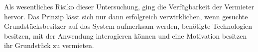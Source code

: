Als wesentliches Risiko dieser Untersuchung, ging die Verfügbarkeit der Vermieter hervor. Das Prinzip lässt sich nur dann erfolgreich verwirklichen, wenn gesuchte Grundstücksbesitzer auf das System aufmerksam werden, benötigte Technologien besitzen, mit der Anwendung interagieren können und eine Motivation besitzen ihr Grundstück zu vermieten. 
 
